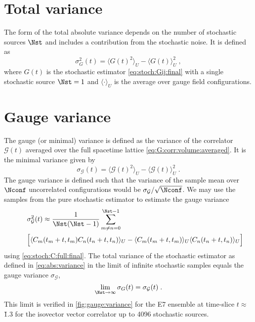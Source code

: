 \section{Total variance}
\label{sec:numerics:total:variance}

The form of the total absolute variance depends on the number of stochastic sources $\Nst$ and includes a contribution from the stochastic noise.
It is defined as
\begin{equation} \label{eq:abs:variance}
\sigma_{G}^{2}(t) = \langle G(t)^{2} \rangle_{U} - \langle G(t) \rangle_{U}^{2} \;,
\end{equation}
where $G(t)$ is the stochastic estimator \cref{eq:stoch:Gij:final} with a single stochastic source $\Nst=1$ and $\langle \cdot \rangle_U$ is the average over gauge field configurations.

\section{Gauge variance}
\label{sec:numerics:gauge:variance}

The gauge (or minimal) variance is defined as the variance of the correlator $\mathcal{G}(t)$ averaged over the full spacetime lattice \cref{eq:G:corr:volume:averaged}.
It is the minimal variance given by
\begin{equation} \label{eq:var:gauge}
\sigma_{\mathcal{G}}(t) = \langle \mathcal{G}(t)^{2} \rangle_{U} - \langle \mathcal{G}(t) \rangle_{U}^{2} \;.
\end{equation}
The gauge variance is defined such that the variance of the sample mean over $\Nconf$ uncorrelated configurations would be $\sigma_{\mathcal{G}}/\sqrt{\Nconf}$.
We may use the samples from the pure stochastic estimator to estimate the gauge variance
\begin{align}
\nonumber
&\sigma^{2}_{\mathcal{G}}(t) \approx
\frac{1}{\Nst(\Nst-1)} \sum_{m \neq n=0}^{\Nst-1}\\
\label{eq:appendix:gv:formula}
\qquad&\Big[ \langle C_m(t_m+t, t_m) C_n(t_n+t, t_n) \rangle_{U}
- \langle C_m(t_m+t,t_m) \rangle_{U} \langle C_n(t_n+t,t_n) \rangle_{U} \Big]
\end{align}
using \cref{eq:stoch:C:full:final}.
The total variance of the stochastic estimator as defined in \cref{eq:abs:variance} in the limit of infinite stochastic samples equals the gauge variance $\sigma_{\mathcal{G}}$,
\begin{equation} \label{eq:var:gauge:limit}
\lim_{\Nst \to \infty} \sigma_{G}(t) = \sigma_{\mathcal{G}}(t) \;.
\end{equation}
This limit is verified in \cref{fig:gauge:variance} for the E7 ensemble at time-slice $t \approx $ \u{1.3}{\femto \metre} for the isovector vector correlator up to \num{4096} stochastic sources.

